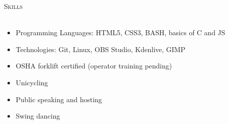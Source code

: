 \documentclass[a4paper]{article}
\newcommand{\lineunder} {
    \vspace*{-8pt} \\
    \hspace*{-18pt} \hrulefill \\
}
\newcommand{\header} [1] {
    {\hspace*{-18pt}\vspace*{6pt} \textsc{#1}}
    \vspace*{-6pt} \lineunder
}
\begin{document}
	\header{Skills}
	\begin{itemize} \itemsep 1pt
		\item Programming Languages: \hspace{2mm} HTML5, CSS3, BASH, basics of C and JS \\
		\item Technologies:         \hspace{21mm}   Git, Linux, OBS Studio, Kdenlive, GIMP \\
		\item OSHA forklift certified (operator training pending) \\
		\item Unicycling \\
		\item Public speaking and hosting \\
		\item Swing dancing \\
	\end{itemize}




	
	
	
\end{document}
